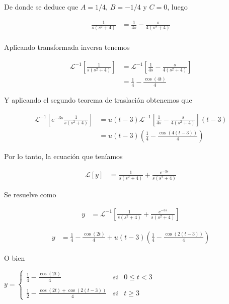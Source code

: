 \documentclass{article}
\theoremstyle{plain}
\theoremstyle{definition}
\begin{document}
De donde se deduce que $A=1/4$, $B=-1/4$ y $C=0$, luego


\begin{align*}
\frac{1}{s(s^2+4)} &= \frac{1}{4s}-\frac{s}{4(s^2+4)} \\
\end{align*}

Aplicando transformada inversa tenemos


\begin{align*}
\mathcal{L}^{-1}\left[  \frac{1}{s(s^2+4)}\right]  &= \mathcal{L}^{-1}\left[\frac{1}{4s}-\frac{s}{4(s^2+4)} \right] \\
&= \frac{1}{4}-\frac{\cos(4t)}{4}
\end{align*}

Y aplicando el segundo teorema de traslación obtenemos que


\begin{align*}
\mathcal{L}^{-1}\left[  e^{-3s}\frac{1}{s(s^2+4)}\right]  &= u(t-3)\mathcal{L}^{-1}\left[\frac{1}{4s}-\frac{s}{4(s^2+4)} \right](t-3) \\
&= u(t-3)\left( \frac{1}{4}- \frac{\cos(4(t-3))}{4} \right)
\end{align*}


Por lo tanto, la ecuación que teníamos

\begin{align*}
\mathcal{L}[y] &=\frac{1}{s(s^2+4)}+\frac{e^{-3s}}{s(s^2+4)}
\end{align*}

Se resuelve como

\begin{align*}
y &= \mathcal{L}^{-1} \left[ \frac{1}{s(s^2+4)}+\frac{e^{-3s}}{s(s^2+4)}\right]
\end{align*}



\begin{align*}
y &= \frac{1}{4}-\frac{\cos(2t)}{4} +u(t-3)\left( \frac{1}{4}- \frac{\cos(2(t-3))}{4} \right)
\end{align*}

O bien



\begin{center}
$y = \left\{ \begin{array}{lcc} \frac{1}{4}-\frac{\cos(2t)}{4} & si &  0\leq t < 3 \\ \\ \frac{1}{2}-\frac{\cos(2t)+\cos(2(t-3))}{4} & si & t \geq 3  \end{array} \right.$
\end{center}
\end{document}
